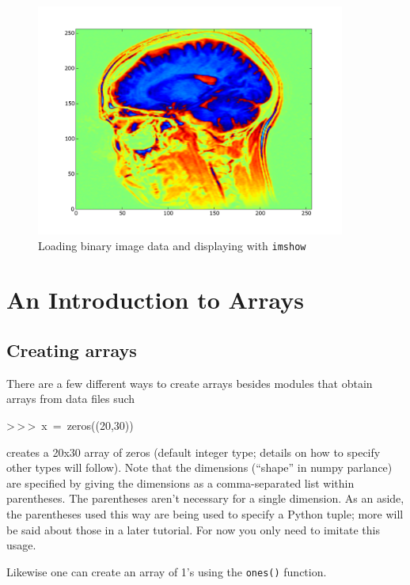 %
\begin{figure}
\begin{centering}
\includegraphics[width=4in]{fig/hothead}
\par\end{centering}

\caption{\label{fig:array_hothead}Loading binary image data and displaying
with \texttt{imshow}}

\end{figure}



\section[Arrays]{An Introduction to Arrays}


\subsection{Creating arrays}

There are a few different ways to create arrays besides modules that
obtain arrays from data files such

\begin{lyxcode}
>\,{}>\,{}>~x~=~zeros((20,30))
\end{lyxcode}
creates a 20x30 array of zeros (default integer type; details on how
to specify other types will follow). Note that the dimensions ({}``shape''
in numpy parlance) are specified by giving the dimensions as a
comma-separated list within parentheses. The parentheses aren't necessary
for a single dimension. As an aside, the parentheses used this way
are being used to specify a Python tuple; more will be said about
those in a later tutorial. For now you only need to imitate this usage.

Likewise one can create an array of 1's using the \texttt{ones()}
function.

